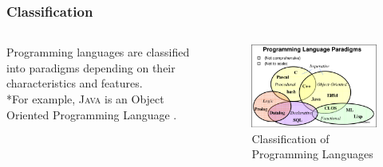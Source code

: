 \documentclass[aspectratio=1610]{beamer}
\begin{document}
\begin{frame}
\frametitle{Classification}
  \begin{columns}[T]
    \begin{column}{.5\textwidth}
     \begin{block}{}
Programming languages are classified into paradigms depending on their characteristics and features. 
\\*For example, \textsc{Java} is an Object Oriented Programming Language \cite{javaintro}.
    \end{block}
    \end{column}
    \begin{column}{.5\textwidth}
    \begin{block}{}
\begin{figure}
    \includegraphics[width=\textwidth]{classification.png} 
    \caption{Classification of Programming Languages \cite{progparaclass}}
 \end{figure}   
    \end{block}
    \end{column}
  \end{columns}
\end{frame}

\end{document}
